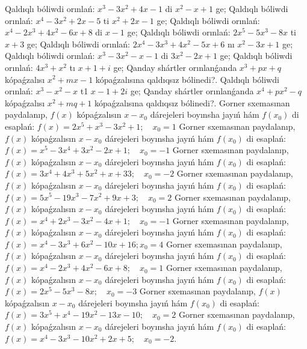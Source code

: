 Qaldıqlı bóliwdi orınlań:  $x^3-3 x^2+4 x-1$ di $x^2-x+1$ ge;
Qaldıqlı bóliwdi orınlań: $x^4-3 x^2+2 x-5$ ti $x^2+2 x-1$ ge;
Qaldıqlı bóliwdi orınlań: $x^4-2 x^3+4 x^2-6 x+8$ di $x-1$ ge;
Qaldıqlı bóliwdi orınlań: $2 x^5-5 x^3-8 x$ ti $x+3$ ge;
Qaldıqlı bóliwdi orınlań: $2 x^4-3 x^3+4 x^2-5 x+6$ nı $x^2-3 x+1$ ge;
Qaldıqlı bóliwdi orınlań: $x^3-3 x^2-x-1$ di $3 x^2-2 x+1$ ge;
Qaldıqlı bóliwdi orınlań: $4 x^3+x^2$ tı $x+1+i$ ge;
Qanday shártler orınlanǵanda $x^3+p x+q$ kópaǵzalısı $x^2+m x-1$ kópaǵzalısına qaldıqsız bólinedi?.
Qaldıqlı bóliwdi orınlań:  $x^3-x^2-x$ t1 $x-1+2 i$ ge;
Qanday shártler orınlanǵanda $x^4+p x^2-q$ kópaǵzalısı $x^2+m q+1$ kópaǵzalısına qaldıqsız bólinedi?.
Gorner sxemasınan paydalanıp, $f(x)$ kópaǵzalısın $x-x_0$ dárejeleri boyınsha jayıń hám $f\left(x_0\right)$ di esaplań:  $f(x)=2 x^5+x^3-3 x^2+1 ; \quad x_0=1$
Gorner sxemasınan paydalanıp, $f(x)$ kópaǵzalısın $x-x_0$ dárejeleri boyınsha jayıń hám $f\left(x_0\right)$ di esaplań: $f(x)=x^5-3 x^4+3 x^2-2 x+1 ; \quad x_0=-1$
Gorner sxemasınan paydalanıp, $f(x)$ kópaǵzalısın $x-x_0$ dárejeleri boyınsha jayıń hám $f\left(x_0\right)$ di esaplań: $f(x)=3 x^4+4 x^3+5 x^2+x+33 ; \quad x_0=-2$
Gorner sxemasınan paydalanıp, $f(x)$ kópaǵzalısın $x-x_0$ dárejeleri boyınsha jayıń hám $f\left(x_0\right)$ di esaplań: $f(x)=5 x^5-19 x^3-7 x^2+9 x+3 ; \quad x_0=2$
Gorner sxemasınan paydalanıp, $f(x)$ kópaǵzalısın $x-x_0$ dárejeleri boyınsha jayıń hám $f\left(x_0\right)$ di esaplań: $f(x)=x^4+2 x^3-3 x^2-4 x+1 ; \quad x_0=-1$
Gorner sxemasınan paydalanıp, $f(x)$ kópaǵzalısın $x-x_0$ dárejeleri boyınsha jayıń hám $f\left(x_0\right)$ di esaplań: $f(x)=x^4-3 x^3+6 x^2-10 x+16 ; x_0=4$
Gorner sxemasınan paydalanıp, $f(x)$ kópaǵzalısın $x-x_0$ dárejeleri boyınsha jayıń hám $f\left(x_0\right)$ di esaplań: $f(x)=x^4-2 x^3+4 x^2-6 x+8 ; \quad x_0=1$
Gorner sxemasınan paydalanıp, $f(x)$ kópaǵzalısın $x-x_0$ dárejeleri boyınsha jayıń hám $f\left(x_0\right)$ di esaplań: $f(x)=2 x^5-5 x^3-8 x ; \quad x_0=-3$
Gorner sxemasınan paydalanıp, $f(x)$ kópaǵzalısın $x-x_0$ dárejeleri boyınsha jayıń hám $f\left(x_0\right)$ di esaplań: $f(x)=3 x^5+x^4-19 x^2-13 x-10 ; \quad x_0=2$
Gorner sxemasınan paydalanıp, $f(x)$ kópaǵzalısın $x-x_0$ dárejeleri boyınsha jayıń hám $f\left(x_0\right)$ di esaplań: $f(x)=x^4-3 x^3-10 x^2+2 x+5 ; \quad x_0=-2$.